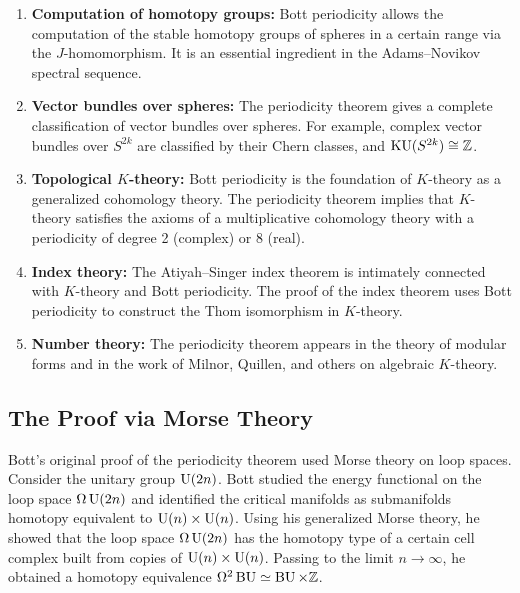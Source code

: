 \begin{enumerate}
\item \textbf{Computation of homotopy groups:} Bott periodicity allows the computation of the stable homotopy groups of spheres in a certain range via the \(J\)-homomorphism. It is an essential ingredient in the Adams--Novikov spectral sequence.

\item \textbf{Vector bundles over spheres:} The periodicity theorem gives a complete classification of vector bundles over spheres. For example, complex vector bundles over \(S^{2k}\) are classified by their Chern classes, and \(\operatorname{KU}(S^{2k}) \cong \mathbb{Z}\).

\item \textbf{Topological \(K\)-theory:} Bott periodicity is the foundation of \(K\)-theory as a generalized cohomology theory. The periodicity theorem implies that \(K\)-theory satisfies the axioms of a multiplicative cohomology theory with a periodicity of degree 2 (complex) or 8 (real).

\item \textbf{Index theory:} The Atiyah--Singer index theorem is intimately connected with \(K\)-theory and Bott periodicity. The proof of the index theorem uses Bott periodicity to construct the Thom isomorphism in \(K\)-theory.

\item \textbf{Number theory:} The periodicity theorem appears in the theory of modular forms and in the work of Milnor, Quillen, and others on algebraic \(K\)-theory.
\end{enumerate}

\subsection{The Proof via Morse Theory}

Bott's original proof of the periodicity theorem used Morse theory on loop spaces. Consider the unitary group \(\operatorname{U}(2n)\). Bott studied the energy functional on the loop space \(\Omega \operatorname{U}(2n)\) and identified the critical manifolds as submanifolds homotopy equivalent to \(\operatorname{U}(n) \times \operatorname{U}(n)\). Using his generalized Morse theory, he showed that the loop space \(\Omega \operatorname{U}(2n)\) has the homotopy type of a certain cell complex built from copies of \(\operatorname{U}(n) \times \operatorname{U}(n)\). Passing to the limit \(n \to \infty\), he obtained a homotopy equivalence \(\Omega^2 \operatorname{BU} \simeq \operatorname{BU} \times \mathbb{Z}\).


